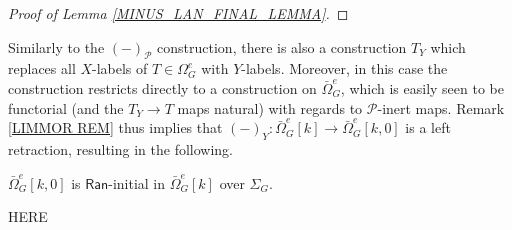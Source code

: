 \documentclass[a4paper,10pt]{article}%
\begin{document}
\begin{proof}[Proof of Lemma \ref{MINUS_LAN_FINAL_LEMMA}]
%
%  
\end{proof}


Similarly to the $(\minus)_{\mathcal{P}}$ construction,
there is also a construction $T_Y$ which replaces all $X$-labels of $T \in \Omega_G^e$ with $Y$-labels. Moreover, in this case the construction restricts directly to a construction on 
$\bar{\Omega}_G^e$,
which is easily seen to be functorial (and the $T_Y \to T$ maps natural) with regards to $\mathcal{P}$-inert maps. Remark \ref{LIMMOR REM} thus implies that 
$(\minus)_Y \colon \bar{\Omega}_G^e[k] \to 
\bar{\Omega}_G^e[k,0]$
is a left retraction, 
resulting in the following.
\begin{lemma}
  \label{ZERO_LAN_FINALITY_LEMMA}
  $\bar{\Omega}_G^{e}[k,0]$ is $\mathsf{Ran}$-initial in $\bar{\Omega}_G^e[k]$ over $\Sigma_G$.
\end{lemma}

{\color{red} HERE}
\end{document}
